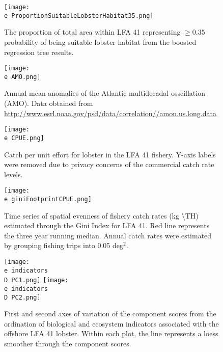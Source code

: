 \documentclass[11pt]{article}
\newcommand{\D}{.}
\newcommand{\e}{/backup/bio_data/bio.lobster/figures/} %
\begin{document}
\begin{figure}

    \texttt{[image: \\e ProportionSuitableLobsterHabitat35.png]}
    \caption{The proportion of total area within LFA 41 representing $\geq 0.35$ probability of being suitable lobster habitat from the boosted regression tree results. }

\end{figure}

\begin{figure}

    \texttt{[image: \\e AMO.png]}
    \caption{Annual mean anomalies of the Atlantic multidecadal osscillation (AMO). Data obtained from \url{http://www.esrl.noaa.gov/psd/data/correlation//amon.us.long.data}}

\end{figure}

\begin{figure}

    \texttt{[image: \\e CPUE.png]}
    \caption{Catch per unit effort for lobster in the LFA 41 fishery. Y-axis labels were removed due to privacy concerns of the commercial catch rate levels.}

\end{figure}

\begin{figure}

    \texttt{[image: \\e giniFootprintCPUE.png]}
    \caption{Time series of spatial evenness of fishery catch rates (kg \textbackslash TH) estimated through the Gini Index for LFA 41. Red line represents the three year running median. Annual catch rates were estimated by grouping fishing trips into 0.05 deg$^2$.}

\end{figure}
\clearpage
\begin{figure}

    \texttt{[image: \\e indicators\\D PC1.png]}
    \texttt{[image: \\e indicators\\D PC2.png]}
    
    \caption{First and second axes of variation of the component scores from the ordination of biological and ecosystem indicators associated with the offshore LFA 41 lobster. Within each plot, the line represents a loess smoother through the component scores.}

\end{figure}
\clearpage
\end{document}
